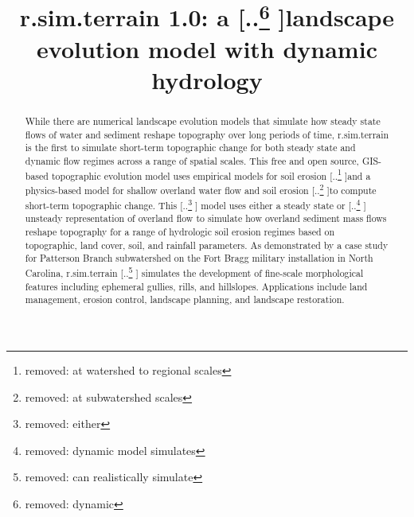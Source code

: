 \documentclass[gmd, manuscript]{copernicus}
\providecommand{\DIFadd}[1]{{\protect\color{blue} \sf #1}} %
\providecommand{\DIFdel}[1]{{\protect\color{red} [..\footnote{removed: #1} ]}} %
\providecommand{\DIFaddbegin}{} %
\providecommand{\DIFaddend}{} %
\providecommand{\DIFdelbegin}{} %
\providecommand{\DIFdelend}{} %
\begin{document}
\title{\DIFdelbegin %
\DIFdelend \DIFaddbegin \lowercase{r.sim.terrain 1.0}\DIFaddend : a \DIFdelbegin \DIFdel{dynamic }\DIFdelend landscape evolution model \DIFaddbegin \DIFadd{with dynamic hydrology}\DIFaddend } 



\DIFdelbegin %
\DIFdelend \DIFaddbegin {} 
\DIFaddend 



\received{}
\pubdiscuss{}
\revised{}
\accepted{}
\published{}


\maketitle

\begin{abstract}
While there are numerical landscape evolution models
that simulate how steady state flows of water and sediment
reshape topography over long periods of time, 
r.sim.terrain is the first to 
simulate short-term topographic change 
for both steady state and dynamic flow regimes
across a range of spatial scales.
This free and open source, 
GIS-based topographic evolution model
uses empirical models for soil erosion
\DIFdelbegin \DIFdel{at watershed to regional scales 
}\DIFdelend and a physics-based model
for shallow overland water flow and soil erosion 
\DIFdelbegin \DIFdel{at subwatershed scales
}\DIFdelend to compute short-term topographic change. 
This \DIFdelbegin \DIFdel{either }\DIFdelend \DIFaddbegin \DIFadd{model uses either a }\DIFaddend steady state 
or \DIFdelbegin \DIFdel{dynamic model simulates
}\DIFdelend \DIFaddbegin \DIFadd{unsteady representation of overland flow
to simulate }\DIFaddend how overland sediment mass flows reshape topography
for a range of hydrologic soil erosion regimes
based on topographic, land cover, soil, and rainfall parameters. 
As demonstrated by a case study 
for Patterson Branch subwatershed
on the Fort Bragg military installation in North Carolina,
r.sim.terrain \DIFdelbegin \DIFdel{can realistically simulate }\DIFdelend \DIFaddbegin \DIFadd{simulates }\DIFaddend the development of 
fine-scale morphological features including 
ephemeral gullies, rills, and hillslopes.
Applications include land management, erosion control,
landscape planning, and landscape restoration. 
\end{abstract}
\end{document}
